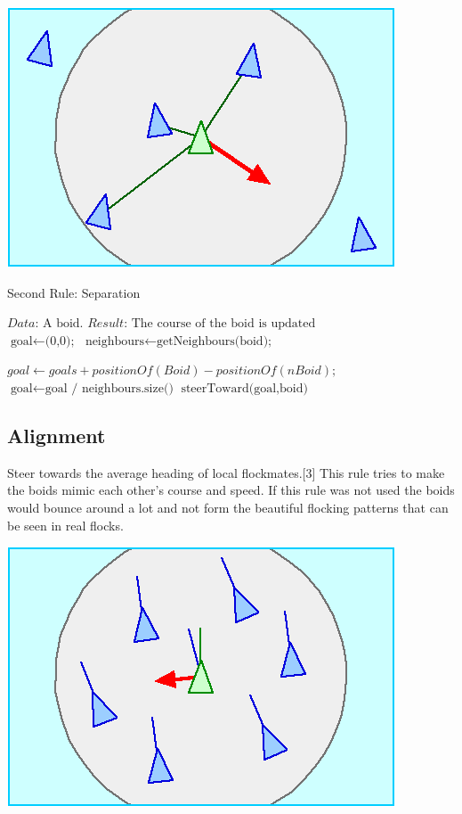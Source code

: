 \documentclass{article}
\begin{document}
\begin{center}
\includegraphics[scale=0.4]{separation.png} 
\end{center}

\begin{algorithm}
\caption{Second Rule: Separation}\label{euclid}
\begin{algorithmic}[1]
\State $\textit{Data:   } \text{A boid.}$
\State $\textit{Result:   } \text{The course of the boid is updated}$
\\
\State $\text{goal} \gets \text{(0,0);}$
\State $\text{neighbours} \gets \text{getNeighbours(boid);}$

    \State $ goal \gets goals + positionOf(Boid) - positionOf(nBoid);$
\Endfor
\State $\text{goal} \gets \text{goal / neighbours.size()}$
\State $\text{steerToward(goal,boid)}$
\end{algorithmic}

\end{algorithm}

\subsection{Alignment}

Steer towards the average heading of local flockmates.[3] This rule tries to make the boids mimic each other's course and speed. If this rule was not used the boids would bounce around a lot and not form the beautiful flocking patterns that can be seen in real flocks.\\

\begin{center}
\includegraphics[scale=0.4]{alignment.png} 
\end{center}
\end{document}
